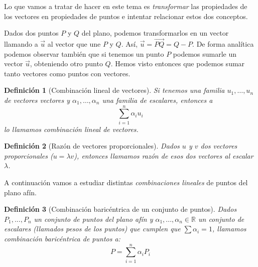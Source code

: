 \documentclass[11pt, a4paper, titlepage]{article}
\newcommand{\R}{\mathbb{R}}
\renewcommand{\vec}{\overrightarrow}
\theoremstyle{theorem-style}
\theoremstyle{definition-style}
\newtheorem{ndef}{Definición}[section]
\theoremstyle{remark-style}
\theoremstyle{example-style}
\begin{document}
\begin{figure*}[h]
  \centering
  \caption{El punto (2,3) en el plano}
\end{figure*}

Lo que vamos a tratar de hacer en este tema es \textit{transformar} las propiedades de los vectores en propiedades de puntos e intentar relacionar estos dos conceptos.

Dados dos puntos $P$ y $Q$ del plano, podemos transformarlos en un vector llamando a $\vec{u}$ al vector que une $P$ y $Q$. Así, $\vec{u} = \overrightarrow{PQ} = Q-P$. De forma analítica podemos observar también que si tenemos un punto $P$ podemos sumarle un vector $\vec{u}$, obteniendo otro punto $Q$. Hemos visto entonces que podemos sumar tanto vectores como puntos con vectores.


\begin{ndef}[Combinación lineal de vectores]
  Si tenemos una familia $u_1,\ldots , u_n$ de vectores vectores y $\alpha_1,\ldots, \alpha_n$ una familia de escalares, entonces a
  \[
    \sum_{i=1}^n \alpha_i u_i
  \]
  lo llamamos \textit{combinación lineal de vectores}.
\end{ndef}

\begin{ndef}[Razón de vectores proporcionales]
  Dados $u$ y $v$ dos vectores proporcionales ($u = \lambda v$), entonces llamamos \textit{razón} de esos dos vectores al escalar $\lambda$.
\end{ndef}

A continuación vamos a estudiar distintas \textit{combinaciones lineales} de puntos del plano afín.

\begin{ndef}[Combinación baricéntrica de un conjunto de puntos]
  Dados $P_1,...,P_n$ un conjunto de puntos del plano afín y $\alpha_1,...,\alpha_n \in \R$ un conjunto de escalares (llamados \textit{pesos} de los puntos) que cumplen que $\sum \alpha_i = 1$, llamamos \textit{combinación baricéntrica de puntos} a:
  \[
    P = \sum_{i=1}^n \alpha_i P_i
  \]
\end{ndef}
\end{document}
